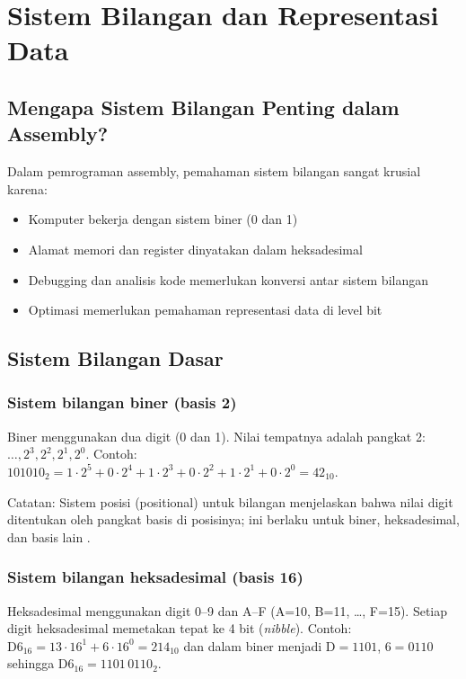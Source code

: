 \section{Sistem Bilangan dan Representasi Data}\label{sec:pengenalan-sistem-bilangan}

\subsection{Mengapa Sistem Bilangan Penting dalam Assembly?}
Dalam pemrograman assembly, pemahaman sistem bilangan sangat krusial karena:
\begin{itemize}
    \item Komputer bekerja dengan sistem biner (0 dan 1)
    \item Alamat memori dan register dinyatakan dalam heksadesimal
    \item Debugging dan analisis kode memerlukan konversi antar sistem bilangan
    \item Optimasi memerlukan pemahaman representasi data di level bit
\end{itemize}

\subsection{Sistem Bilangan Dasar}\label{subsec:pengenalan-dasar-bilangan}

\subsubsection{Sistem bilangan biner (basis 2)}
Biner menggunakan dua digit (0 dan 1). Nilai tempatnya adalah pangkat 2: \(\ldots, 2^3, 2^2, 2^1, 2^0\). Contoh: \(101010_2 = 1\cdot 2^5 + 0\cdot 2^4 + 1\cdot 2^3 + 0\cdot 2^2 + 1\cdot 2^1 + 0\cdot 2^0 = 42_{10}\).

Catatan: Sistem posisi (positional) untuk bilangan menjelaskan bahwa nilai digit ditentukan oleh pangkat basis di posisinya; ini berlaku untuk biner, heksadesimal, dan basis lain \cite{wiki_binary_number,wiki_positional_numeral_system}.

\subsubsection{Sistem bilangan heksadesimal (basis 16)}
Heksadesimal menggunakan digit 0--9 dan A--F (A=10, B=11, \ldots, F=15). Setiap digit heksadesimal memetakan tepat ke 4 bit (\textit{nibble}). Contoh: \(\mathrm{D6}_{16} = 13\cdot 16^1 + 6\cdot 16^0 = 214_{10}\) dan dalam biner menjadi \(\mathrm{D} = 1101\), \(6 = 0110\) sehingga \(\mathrm{D6}_{16} = 1101\,0110_2\).

